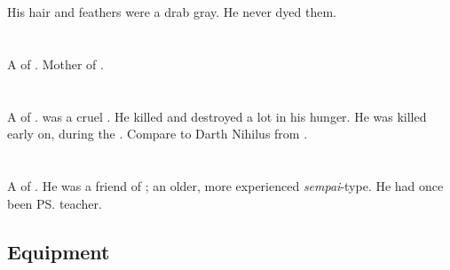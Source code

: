 His hair and feathers were a drab gray.
He never dyed them.















\section{\Jeshred}
\index{\Jeshred} 
A \thelyad{} \resvil{} of \CiriathSepher.
Mother of \Zereth. 















\section{\Mehaloch}
\index{\Mehaloch}
A \sathariah of \CiriathSepher. 
\Mehaloch was a cruel .
He killed and destroyed a lot in his hunger.
He was killed early on, during the \secondbanewar.
Compare to Darth Nihilus from \cite{VideoGame:KOTORII}.















\section{\Menessiaraid}
\index{\Menessiaraid}
A \ketheran{} \resphan{} of \CiriathSepher. 
He was a friend of ; an older, more experienced \emph{sempai}-type. 
He had once been \ps{\Teshrial} teacher. 









\subsection{Equipment}





